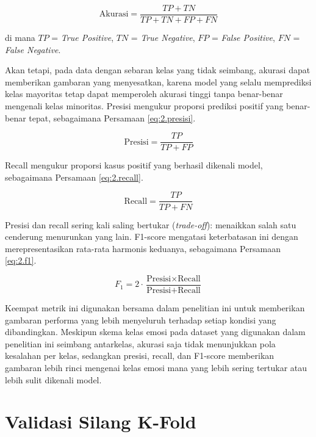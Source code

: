 \begin{equation}
  \text{Akurasi} = \frac{TP + TN}{TP + TN + FP + FN}
  \label{eq:2.akurasi}
\end{equation}

\noindent
di mana $TP$ = \emph{True Positive}, $TN$ = \emph{True Negative}, $FP$ =
\emph{False Positive}, $FN$ = \emph{False Negative}.

Akan tetapi, pada data dengan sebaran kelas yang tidak seimbang, akurasi
dapat memberikan gambaran yang menyesatkan, karena model yang selalu
memprediksi kelas mayoritas tetap dapat memperoleh akurasi tinggi tanpa
benar-benar mengenali kelas minoritas. Presisi mengukur proporsi
prediksi positif yang benar-benar tepat, sebagaimana Persamaan
\ref{eq:2.presisi}.

\begin{equation}
  \text{Presisi} = \frac{TP}{TP + FP}
  \label{eq:2.presisi}
\end{equation}

\noindent
Recall mengukur proporsi kasus positif yang berhasil dikenali model,
sebagaimana Persamaan \ref{eq:2.recall}.

\begin{equation}
  \text{Recall} = \frac{TP}{TP + FN}
  \label{eq:2.recall}
\end{equation}

\noindent
Presisi dan recall sering kali saling bertukar (\emph{trade-off}):
menaikkan salah satu cenderung menurunkan yang lain. F1-score mengatasi
keterbatasan ini dengan merepresentasikan rata-rata harmonis keduanya,
sebagaimana Persamaan \ref{eq:2.f1}.

\begin{equation}
  F_1 = 2 \cdot \frac{\text{Presisi} \times \text{Recall}}{\text{Presisi} + \text{Recall}}
  \label{eq:2.f1}
\end{equation}

Keempat metrik ini digunakan bersama dalam penelitian ini untuk
memberikan gambaran performa yang lebih menyeluruh terhadap setiap
kondisi yang dibandingkan. Meskipun skema kelas emosi pada dataset yang
digunakan dalam penelitian ini seimbang antarkelas, akurasi saja tidak
menunjukkan pola kesalahan per kelas, sedangkan presisi, recall, dan
F1-score memberikan gambaran lebih rinci mengenai kelas emosi mana yang
lebih sering tertukar atau lebih sulit dikenali model.

\section{Validasi Silang K-Fold}
\label{sec:2.12}

